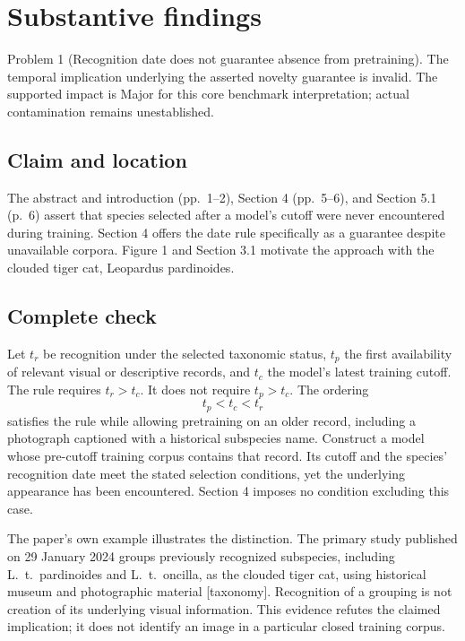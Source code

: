 \documentclass[10pt]{article}
\begin{document}
\section*{Substantive findings}
Problem 1 (Recognition date does not guarantee absence from pretraining).  The temporal implication underlying the asserted novelty guarantee is invalid. The supported impact is Major for this core benchmark interpretation; actual contamination remains unestablished.\par
\subsection*{Claim and location}
The abstract and introduction (pp. 1–2), Section 4 (pp. 5–6), and Section 5.1 (p. 6) assert that species selected after a model’s cutoff were never encountered during training. Section 4 offers the date rule specifically as a guarantee despite unavailable corpora. Figure 1 and Section 3.1 motivate the approach with the clouded tiger cat, Leopardus pardinoides.\par
\subsection*{Complete check}
Let \(t_r\) be recognition under the selected taxonomic status, \(t_p\) the first availability of relevant visual or descriptive records, and \(t_c\) the model’s latest training cutoff. The rule requires \(t_r>t_c\). It does not require \(t_p>t_c\). The ordering \[t_p<t_c<t_r\] satisfies the rule while allowing pretraining on an older record, including a photograph captioned with a historical subspecies name. Construct a model whose pre-cutoff training corpus contains that record. Its cutoff and the species’ recognition date meet the stated selection conditions, yet the underlying appearance has been encountered. Section 4 imposes no condition excluding this case.\par
The paper’s own example illustrates the distinction. The primary study published on 29 January 2024 groups previously recognized subspecies, including L. t. pardinoides and L. t. oncilla, as the clouded tiger cat, using historical museum and photographic material [taxonomy]. Recognition of a grouping is not creation of its underlying visual information. This evidence refutes the claimed implication; it does not identify an image in a particular closed training corpus.\par
\end{document}
